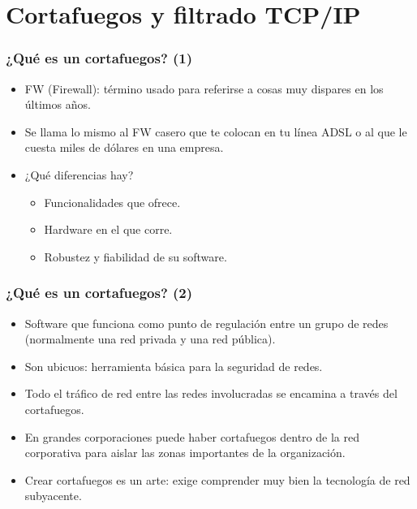 \documentclass{beamer}
\begin{document}



\section{Cortafuegos y filtrado TCP/IP}


\begin{frame}
\frametitle{¿Qué es un cortafuegos? (1)}

\begin{itemize}
\item FW (Firewall): término usado para referirse a cosas muy dispares en los últimos años.
\item Se llama lo mismo al FW casero que te colocan en tu línea ADSL o al que le cuesta miles de dólares en una empresa.
\item ¿Qué diferencias hay?

	\begin{itemize}
	\item Funcionalidades que ofrece.
	\item Hardware en el que corre.
	\item Robustez y fiabilidad de su software.
	\end{itemize}

\end{itemize}
\end{frame}


\begin{frame}
\frametitle{¿Qué es un cortafuegos? (2)}

\begin{itemize}
\item Software que funciona como punto de regulación entre un grupo de redes (normalmente una red privada y una red pública).
\item Son ubicuos: herramienta básica para la seguridad de redes.
\item Todo el tráfico de red entre las redes involucradas se encamina a través del cortafuegos.
\item En grandes corporaciones puede haber cortafuegos dentro de la red corporativa para aislar las zonas importantes de la organización.
\item Crear cortafuegos es un arte: exige comprender muy bien la tecnología de red subyacente.
\end{itemize}

\end{frame}
\end{document}
